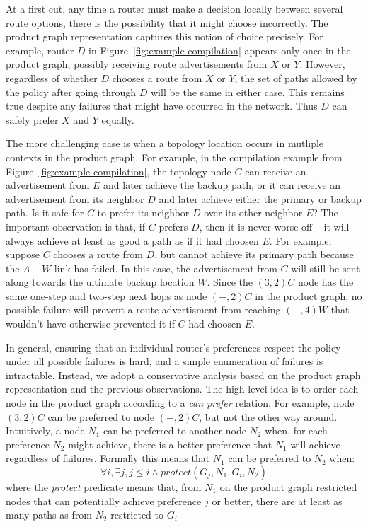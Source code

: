 At a first cut, any time a router must make a decision locally between several route options, there is the possibility that it might choose incorrectly. The product graph representation captures this notion of choice precisely. For example, router $D$ in Figure~\ref{fig:example-compilation} appears only once in the product graph, possibly receiving route advertisements from $X$ or $Y$. However, regardless of whether $D$ chooses a route from $X$ or $Y$, the set of paths allowed by the policy after going through $D$ will be the same in either case. This remains true despite any failures that might have occurred in the network. Thus $D$ can safely prefer $X$ and $Y$ equally.

The more challenging case is when a topology location occurs in mutliple contexts in the product graph. For example, in the compilation example from Figure~\ref{fig:example-compilation}, the topology node $C$ can receive an advertisement from $E$ and later achieve the backup path, or it can receive an advertisement from its neighbor $D$ and later achieve either the primary or backup path. Is it safe for $C$ to prefer its neighbor $D$ over its other neighbor $E$? The important observation is that, if $C$ prefers $D$, then it is never worse off -- it will always achieve at least as good a path as if it had choosen $E$.
For example, suppose $C$ chooses a route from $D$, but cannot achieve its primary path because the $A$ -- $W$ link has failed. In this case, the advertisement from $C$ will still be sent along towards the ultimate backup location $W$. Since the $(3,2) C$ node has the same one-step and two-step next hops as node $(-,2) C$ in the product graph, no possible failure will prevent a route advertisment from reaching $(-,4) W$ that wouldn't have otherwise prevented it if $C$ had choosen $E$.

In general, ensuring that an individual router's preferences respect the policy under all possible failures is hard, and a simple enumeration of failures is intractable. Instead, we adopt a conservative analysis based on the product graph representation and the previous observations. The high-level idea is to order each node in the product graph according to a \textit{can prefer} relation. For example, node $(3,2) C$ can be preferred to node $(-,2) C$, but not the other way around. Intuitively, a node $N_1$ can be preferred to another node $N_2$ when, for each preference $N_2$ might achieve, there is a better preference that $N_1$ will achieve regardless of failures. Formally this means that $N_1$ can be preferred to $N_2$ when:
%
$$\forall i, \exists j, j \leq i \wedge protect(G_j, N_1, G_i, N_2)$$
%
where the \textit{protect} predicate means that, from $N_1$ on the product graph restricted nodes that can potentially achieve preference $j$ or better, there are at least as many paths as from $N_2$ restricted to $G_i$

